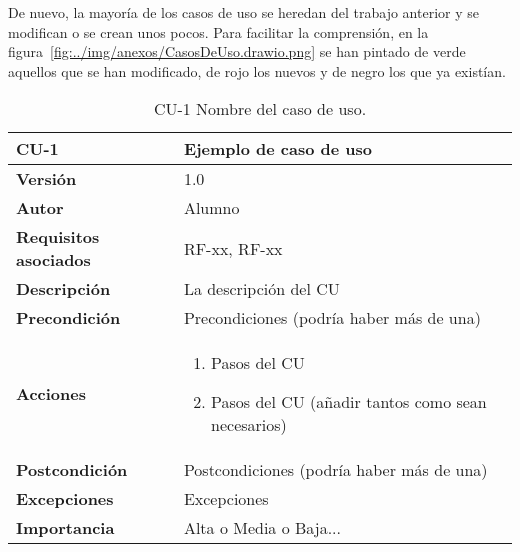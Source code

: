 De nuevo, la mayoría de los casos de uso se heredan del trabajo anterior y se modifican o se crean unos pocos. Para facilitar la comprensión, en la figura~\ref{fig:../img/anexos/CasosDeUso.drawio.png} se han pintado de verde aquellos que se han modificado, de rojo los nuevos y de negro los que ya existían.





\begin{table}[p]
	\centering
	\begin{tabularx}{\linewidth}{ p{} p{} }
		\toprule
		\textbf{CU-1}    & \textbf{Ejemplo de caso de uso}\\
		\toprule
		\textbf{Versión}              & 1.0    \\
		\textbf{Autor}                & Alumno \\
		\textbf{Requisitos asociados} & RF-xx, RF-xx \\
		\textbf{Descripción}          & La descripción del CU \\
		\textbf{Precondición}         & Precondiciones (podría haber más de una) \\
		\textbf{Acciones}             &
		\begin{enumerate}
			\def\labelenumi{\arabic{enumi}.}
			\tightlist
			\item Pasos del CU
			\item Pasos del CU (añadir tantos como sean necesarios)
		\end{enumerate}\\
		\textbf{Postcondición}        & Postcondiciones (podría haber más de una) \\
		\textbf{Excepciones}          & Excepciones \\
		\textbf{Importancia}          & Alta o Media o Baja... \\
		\bottomrule
	\end{tabularx}
	\caption{CU-1 Nombre del caso de uso.}
\end{table}
